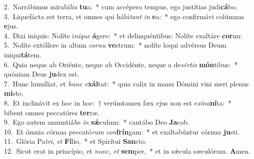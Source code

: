 {2.~}Narrábimus mirabí\textit{li}\textit{a} \textbf{tu}a:~* cum accépero tempus, ego justítias judi\textbf{cá}bo.\\
{3.~}Liquefácta est terra, et omnes qui hábi\textit{tant} \textit{in} \textbf{e}a:~* ego confirmávi colúmnas \textbf{e}jus.\\
{4.~}Dixi iníquis: Nolíte i\textit{ní}\textit{que} \textbf{á}gere:~* et delinquéntibus: Nolíte exaltáre \textbf{cor}nu:\\
{5.~}Nolíte extóllere in altum \textit{cor}\textit{nu} \textbf{ve}strum:~* nolíte loqui advérsus Deum iniqui\textbf{tá}tem.\\
{6.~}Quia neque ab Oriénte, neque ab Occidénte, neque a de\textit{sér}\textit{tis} \textbf{món}tibus:~* quóniam Deus \textbf{ju}dex est.\\
{7.~}Hunc humíliat, et \textit{hunc} \textit{e}\textbf{xál}tat:~* quia calix in manu Dómini vini meri plenus \textbf{mi}sto.\\
{8.~}Et inclinávit ex hoc in hoc:~† verúmtamen fæx ejus non est e\textit{xi}\textit{na}\textbf{ní}ta:~* bibent omnes peccatóres \textbf{ter}ræ.\\
{9.~}Ego autem annuntiá\textit{bo} \textit{in} \textbf{sǽ}culum:~* cantábo Deo \textbf{Ja}cob.\\
{10.~}Et ómnia córnua peccató\textit{rum} \textit{con}\textbf{frín}gam:~* et exaltabúntur córnua \textbf{ju}sti.\\
{11.~}Glória Pa\textit{tri}, \textit{et} \textbf{Fí}lio,~* et Spirítui \textbf{San}cto.\\
{12.~}Sicut erat in princípio, et \textit{nunc}, \textit{et} \textbf{sem}per,~* et in sǽcula sæculórum. \textbf{A}men.\\
